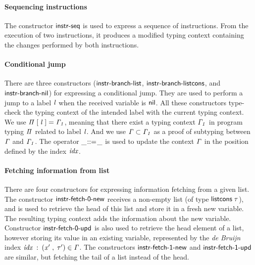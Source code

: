 \documentclass[review]{elsarticle}
\theoremstyle{definition}
\newcommand{\D}[1]{\blue{\mathsf{#1}}}
\newcommand{\Con}[1]{\red{\mathsf{#1}}}
\newcommand{\F}[1]{\green{\mathsf{#1}}}
\newcommand{\V}[1]{\purple{\mathit{#1}}}
\begin{document}
\paragraph{Sequencing instructions}{The constructor \ensuremath{\Con{instr\textrm{-}seq}} is used to
express a sequence of instructions. From the execution of two instructions, it
produces a modified typing context containing the changes performed by
both instructions.}

\paragraph{Conditional jump}{There are three constructors (\ensuremath{\Con{instr\textrm{-}branch\textrm{-}list}},
\ensuremath{\Con{instr\textrm{-}branch\textrm{-}listcons}}, and \ensuremath{\Con{instr\textrm{-}branch\textrm{-}nil}}) for expressing a conditional
jump. They are used to perform a jump to a label \ensuremath{\V{l}} when the received variable is \ensuremath{\Con{nil}}.
All these constructors type-check the typing context of the intended label with the
current typing context. We use \ensuremath{\V{\Pi}\;\D{[}\;\V{l}\;\D{]=}\;\V{\Gamma_1}}, meaning that there exist a typing context
\ensuremath{\V{\Gamma_1}} in program typing \ensuremath{\V{\Pi}} related to label \ensuremath{\V{l}}. And we use \ensuremath{\V{\Gamma}\;\D{\subset}\;\V{\Gamma_1}} as a proof of
subtyping between \ensuremath{\V{\Gamma}} and \ensuremath{\V{\Gamma_1}}. The operator \ensuremath{\F{\_\hspace{-2pt}::=\hspace{-2pt}\_}} is used to update the context \ensuremath{\V{\Gamma}}
in the position defined by the index \ensuremath{\V{idx}}.}

\paragraph{Fetching information from list}{There are four constructors for expressing
information fetching from a given list. The constructor \ensuremath{\Con{instr\textrm{-}fetch\textrm{-}0\textrm{-}new}} receives a
non-empty list (of type \ensuremath{\Con{listcons}\;\V{\tau}}), and is used to retrieve the head of this list and store it
in a fresh new variable. The resulting typing context adds the information about the new
variable. Constructor \ensuremath{\Con{instr\textrm{-}fetch\textrm{-}0\textrm{-}upd}} is also used to retrieve the head element of a
list, however storing its value in an existing variable, represented by the \emph{de Bruijn}
index \ensuremath{\V{idx}\;\mathbin{:}\;(\V{x'}\;\red{,}\,\;\V{\tau'})\;\D{\in}\;\V{\Gamma}}. The constructors \ensuremath{\Con{instr\textrm{-}fetch\textrm{-}1\textrm{-}new}} and \ensuremath{\Con{instr\textrm{-}fetch\textrm{-}1\textrm{-}upd}}
are similar, but fetching the tail of a list instead of the head.}
\end{document}
